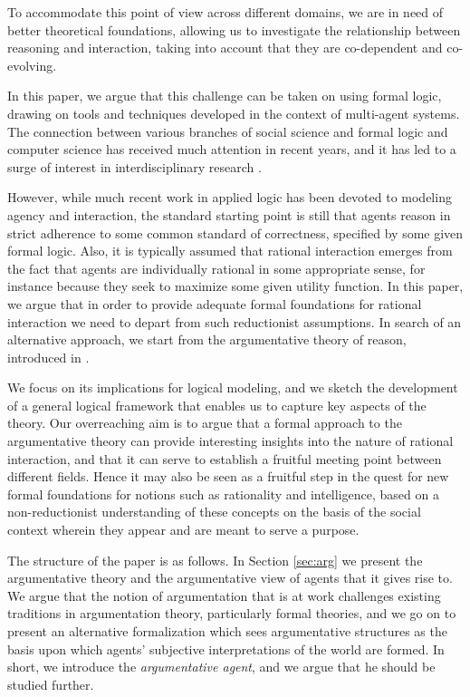 \documentclass[greybox]{svmult}
\begin{document}
To accommodate this point of view across different domains, we are in need of better theoretical foundations, allowing us to investigate the relationship between reasoning and interaction, taking into account that they are co-dependent and co-evolving. 

In this paper, we argue that this challenge can be taken on using formal logic, drawing on tools and techniques developed in the context of multi-agent systems. The connection between various branches of social science and formal logic and computer science has received much attention in recent years, and it has led to a surge of interest in interdisciplinary research \cite{benthem2,verbrugge,parikh}.

However, while much recent work in applied logic has been devoted to modeling agency and interaction, the standard starting point is still that agents reason in strict adherence to some common standard of correctness, specified by some given formal logic. Also, it is typically assumed that rational interaction emerges from the fact that agents are individually rational in some appropriate sense, for instance because they seek to maximize some given utility function. In this paper, we argue that in order to provide adequate formal foundations for rational interaction we need to depart from such reductionist assumptions. In search of an alternative approach, we start from the argumentative theory of reason, introduced in \cite{mercier}.

We focus on its implications for logical modeling, and we sketch the development of a general logical framework that enables us to capture key aspects of the theory. Our overreaching aim is to argue that a formal approach to the argumentative theory can provide interesting insights into the nature of rational interaction, and that it can serve to establish a fruitful meeting point between different fields. Hence it may also be seen as a fruitful step in the quest for new formal foundations for notions such as rationality and intelligence, based on a non-reductionist understanding of these concepts on the basis of the social context wherein they appear and are meant to serve a purpose.

The structure of the paper is as follows. In Section \ref{sec:arg} we present the argumentative theory and the argumentative view of agents that it gives rise to. We argue that the notion of argumentation that is at work challenges existing traditions in argumentation theory, particularly formal theories, and we go on to present an alternative formalization which sees argumentative structures as the basis upon which agents' subjective interpretations of the world are formed. In short, we introduce the \emph{argumentative agent}, and we argue that he should be studied further.
\end{document}
